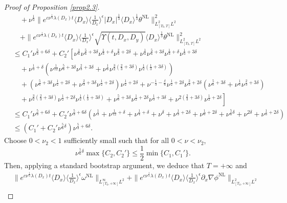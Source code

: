 \documentclass[reqno, 12pt]{amsart} %
\theoremstyle{plain} %
\theoremstyle{definition}
\theoremstyle{remark}
\numberwithin{equation}{section} %
\newcommand{\lt}{\left}
\newcommand{\rt}{\right}
\begin{document}
\begin{proof}[Proof of Proposition \ref{prop2.3}]
\begin{align*}
			& \quad+ \nu^{\frac{1}{3}}\|e^{c \nu^{\frac{1}{3}} \lambda\left(D_x\right) t}\langle D_x\rangle\langle\frac{1}{D_x}\rangle^\epsilon\left|D_x\right|^{\frac{1}{3}}  \langle D_x \rangle ^\frac13 \theta^{\mathrm{NL}}\|_{L_{[T_0, T]}^2 L^2}^2  
			\\
			& \quad+\|e^{c \nu^{\frac{1}{3}} \lambda\left(D_x\right) t}\langle D_x\rangle\langle\frac{1}{D_x}\rangle^\epsilon \sqrt{\Upsilon\left(t, D_x, D_y\right)} \langle D_x \rangle^\frac13  \theta^{\mathrm{NL}}\|_{L_{[T_0, T]}^2 L^2}^2 \\
			&\leq C_1'\nu^{\frac53 + 6\delta} +  C_2' \lt[ \nu^\frac16 \nu^{\frac56 + 3\delta} \nu^{\frac13 +\delta } \nu^{\frac23 + 2\delta}  + \nu^\frac14 \nu^{\frac56 + 3\delta} \nu^{\frac13 +\delta } \nu^{\frac13 + 3\delta} \rt. \\
			&\lt.\quad +\nu^{\frac13 +\delta }(\nu^{\frac1{12}} \nu^{\frac56 + 3\delta} \nu^{\frac23 + 3\delta} +  \nu^\frac16  \nu^{\frac32 (\frac23 + 3\delta)}    \nu^{\frac12 (\frac13 + 3\delta)}  ) \rt. \\
			&\lt. \quad + (\nu^{\frac56 + 3\delta}  \nu^{\frac12 + 2\delta} + \nu^{\frac23 + 3\delta} \nu^{\frac12 + 2\delta} ) \nu^{\frac12 + 2\delta}   + \nu^{-\frac13 - \frac\delta6} \nu^{\frac12 + 2\delta} \nu^{\frac23 + 2\delta}(\nu^{\frac56 + 3\delta} + \nu^\frac16 \nu^{\frac23 + 3\delta}) \rt. \\
			& \lt. \quad + \nu^{\frac32 (\frac23 + 3\delta)}  \nu^{\frac12 + 2\delta} \nu^{\frac12 (\frac13 + 3\delta)}  + \nu^{\frac56 + 3\delta} \nu^{\frac12 + 2\delta} \nu^{\frac13 + 3\delta}  + \nu^{2(\frac23 + 3\delta)}\nu^{\frac12 + 2\delta} \rt] \\
			&\leq  C_1'\nu^{\frac53 + 6\delta} +  C_2'
			\nu^{\frac{5}{3} + 6\delta}  \left(
			\nu^{\frac{1}{3}} 
			+ \nu^{\frac{1}{12} + \delta} 
			+ \nu^{\frac{1}{4} + \delta} 
			+ \nu^\delta
			+ \nu^{\frac{1}{3} + 2\delta} 
			+ \nu^{\frac{1}{6} + 2\delta} 
			+ \nu^{\frac{5}{6}\delta} 
			+ \nu^{2\delta} 
			+ \nu^{\frac{1}{6} + 2\delta}
			\right) \\
			&\leq ( C_1' +   C_2'\nu^{\frac{5}{6} \delta}   )  \nu^{\frac{5}{3} + 6\delta}.
		\end{align*}
		Choose $0<\nu_2<1$ sufficiently small such that for all $0<\nu<\nu_2$, 
		$$
		\nu^{\frac{5}{6} \delta} \max\{C_2, C_2'\} \leq \frac{1}{2} \min\{C_1, C_1'\}.
		$$
		Then, applying a standard bootstrap argument, we deduce that $T=+\infty$ and 
		\begin{equation*} 
			\begin{aligned}
				&\| e^{c \nu^{\frac{1}{3}} \lambda(D_x) t} \langle D_x \rangle \langle \tfrac{1}{D_x} \rangle^\epsilon \omega^{\mathrm{NL}} \|_{L^\infty_{[T_0, +\infty]} L^2}  + \|e^{c \nu^{\frac{1}{3}} \lambda\left(D_x\right) t}\langle D_x\rangle\langle\frac{1}{D_x}\rangle^\epsilon \partial_x \nabla \phi^{\mathrm{NL}}\|_{L_{[T_0, +\infty]}^2 L^2} \\

\end{aligned}
\end{equation*}
\end{proof}
\end{document}
